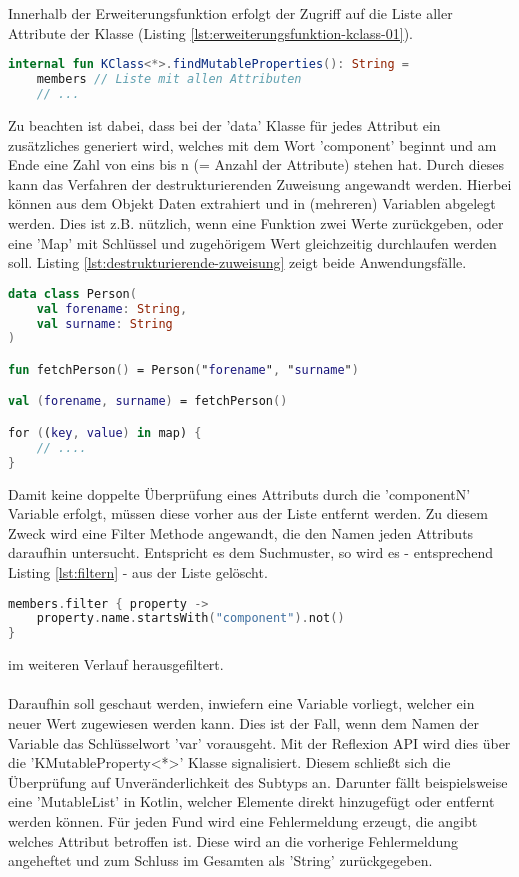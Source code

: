 \\\\
Innerhalb der Erweiterungsfunktion erfolgt der Zugriff auf die Liste aller Attribute der Klasse (Listing
\ref{lst:erweiterungsfunktion-kclass-01}).
\begin{lstlisting}[caption={Erweiterungsfunktion 'KClass' mit Liste aller Attribute}, label={lst:erweiterungsfunktion-kclass-01}, language=Kotlin]
internal fun KClass<*>.findMutableProperties(): String =
	members // Liste mit allen Attributen
	// ...
\end{lstlisting}
\bigskip
Zu beachten ist dabei, dass bei der 'data' Klasse für jedes Attribut ein zusätzliches generiert wird, welches mit dem Wort 'component' beginnt und am Ende eine Zahl von eins bis n (= Anzahl der Attribute) stehen hat. Durch dieses kann das Verfahren der destrukturierenden Zuweisung angewandt werden. Hierbei können aus dem Objekt Daten extrahiert und in (mehreren) Variablen abgelegt werden. Dies ist z.B. nützlich, wenn eine Funktion zwei Werte zurückgeben, oder eine 'Map' mit Schlüssel und zugehörigem Wert gleichzeitig durchlaufen werden soll. Listing
\ref{lst:destrukturierende-zuweisung}
zeigt beide Anwendungsfälle.
\begin{lstlisting}[caption={Destrukturierende Zuweisung}, label={lst:destrukturierende-zuweisung}, language=Kotlin]
data class Person(
	val forename: String,
	val surname: String
)

fun fetchPerson() = Person("forename", "surname")

val (forename, surname) = fetchPerson()

for ((key, value) in map) {
	// .... 
}
\end{lstlisting}
Damit keine doppelte Überprüfung eines Attributs durch die 'componentN' Variable erfolgt, müssen diese vorher aus der Liste entfernt werden. Zu diesem Zweck wird eine Filter Methode angewandt, die den Namen jeden Attributs daraufhin untersucht. Entspricht es dem Suchmuster, so wird es - entsprechend Listing 
\ref{lst:filtern}
- aus der Liste gelöscht.
\begin{lstlisting}[caption={Filtern}, label={lst:filtern}, language=Kotlin] 
members.filter { property -> 
	property.name.startsWith("component").not() 
}
\end{lstlisting}
\bigskip
im weiteren Verlauf herausgefiltert. 
\\\\
Daraufhin soll geschaut werden, inwiefern eine Variable vorliegt, welcher ein neuer Wert zugewiesen werden kann. Dies ist der Fall, wenn dem Namen der Variable das Schlüsselwort 'var' vorausgeht. Mit der Reflexion API wird dies über die 'KMutableProperty<*>' Klasse signalisiert. Diesem schließt sich die Überprüfung auf Unveränderlichkeit des Subtyps an. Darunter fällt beispielsweise eine 'MutableList' in Kotlin, welcher Elemente direkt hinzugefügt oder entfernt werden können. Für jeden Fund wird eine Fehlermeldung erzeugt, die angibt welches Attribut betroffen ist. Diese wird an die vorherige Fehlermeldung angeheftet und zum Schluss im Gesamten als 'String' zurückgegeben.
